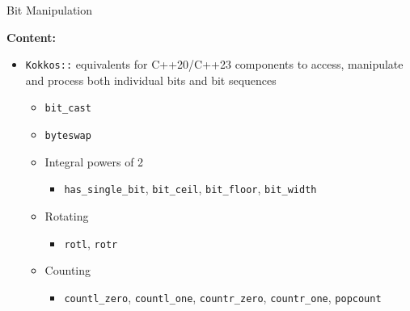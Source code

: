 
\begin{frame}[fragile]

	{\Huge Bit Manipulation}

	\vspace{10pt}

	\textbf{Content:}
	\begin{itemize}
		\item \texttt{Kokkos::} equivalents for C++20/C++23 components to access, manipulate and process both individual bits and bit sequences
		      \begin{itemize}
		      	\item \texttt{bit\_cast}
		      	\item \texttt{byteswap}
		      	\item Integral powers of 2
		      	      \begin{itemize}
		      	      	\item \texttt{has\_single\_bit}, \texttt{bit\_ceil}, \texttt{bit\_floor}, \texttt{bit\_width}
		      	      \end{itemize}
		      	\item Rotating
		      	      \begin{itemize}
		      	      	\item \texttt{rotl}, \texttt{rotr}
		      	      \end{itemize}
		      	\item Counting
		      	      \begin{itemize}
		      	      	\item \texttt{countl\_zero}, \texttt{countl\_one}, \texttt{countr\_zero}, \texttt{countr\_one}, \texttt{popcount}
		      	      \end{itemize}
		      \end{itemize}
	\end{itemize}
\end{frame}


